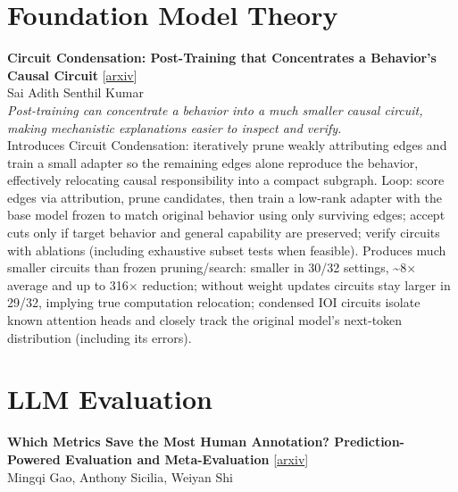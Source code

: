 \documentclass[12pt,letterpaper]{article}
\begin{document}
\medskip


\section*{Foundation Model Theory}

{\small\textbf{Circuit Condensation: Post-Training that Concentrates a Behavior's Causal Circuit}} {\scriptsize[\href{https://arxiv.org/abs/2608.27254}{arxiv}]}\\
{\scriptsize Sai Adith Senthil Kumar}\\

{\small\textit{Post-training can concentrate a behavior into a much smaller causal circuit, making mechanistic explanations easier to inspect and verify.}}\\[1pt]
{\footnotesize Introduces Circuit Condensation: iteratively prune weakly attributing edges and train a small adapter so the remaining edges alone reproduce the behavior, effectively relocating causal responsibility into a compact subgraph. Loop: score edges via attribution, prune candidates, then train a low-rank adapter with the base model frozen to match original behavior using only surviving edges; accept cuts only if target behavior and general capability are preserved; verify circuits with ablations (including exhaustive subset tests when feasible). Produces much smaller circuits than frozen pruning/search: smaller in 30/32 settings, \textasciitilde{}8× average and up to 316× reduction; without weight updates circuits stay larger in 29/32, implying true computation relocation; condensed IOI circuits isolate known attention heads and closely track the original model's next-token distribution (including its errors).}

\medskip


\section*{LLM Evaluation}

{\small\textbf{Which Metrics Save the Most Human Annotation? Prediction-Powered Evaluation and Meta-Evaluation}} {\scriptsize[\href{https://arxiv.org/abs/2608.26638}{arxiv}]}\\
{\scriptsize Mingqi Gao, Anthony Sicilia, Weiyan Shi}\\
\end{document}
